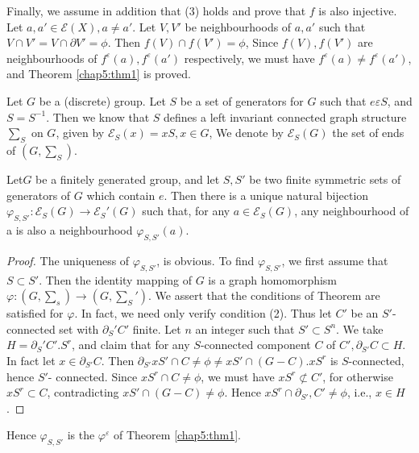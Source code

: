 Finally, we assume in addition that (3) holds and prove that $f$ is
also injective. Let $a, a' \in \mathscr{E} (X), a \neq a'$. Let $V,
V'$ be neighbourhoods of $a, a'$ such that $  V \cap V' = V \cap
\partial V' = \phi $. Then $f(V)\cap f(V')= \phi$, Since $f(V), f(V')$
are neighbourhoods of $f^{\varepsilon}(a), f^{\varepsilon}(a')$
respectively, we must have $f^\varepsilon (a) \neq f^\varepsilon
(a')$, and Theorem \ref{chap5:thm1} is proved.   

Let $G$ be a (discrete) group. Let $S$ be a set of generators for
$G$ such that $e \varepsilon S$, and $S = S^{-1}$. Then we know that
$S$ defines a left invariant connected graph structure $\sum_S$ on
$G$,  given by $\mathscr{E}_S (x) = x S, x \in G$, We denote by
$\mathscr{E}_S (G)$ the set of ends of $(G, \sum_S)$.  

\begin{thm} %
  Let\pageoriginale $G$ be a finitely generated group, and let $S, S'$ be two finite
  symmetric sets of generators of $G$ which contain $e$. Then there is a
  unique natural bijection $\varphi_{S, S'} : \mathscr{E}_S (G) \to
  \mathscr{E}_S'(G)$ such that, for any $a \in \mathscr{E}_S (G)$, any
  neighbourhood of a is also a neighbourhood $\varphi _{S, S'}(a)$. 
\end{thm}

\begin{proof}
  The uniqueness of $\varphi _{S, S'}$, is obvious. To find $\varphi
  _{S,S'}$, we first assume that $S \subset S'$. Then the identity
  mapping of $G$ is a graph homomorphism $\varphi : (G, \sum_s)\to
  (G, \sum_S')$. We assert that the conditions of Theorem are satisfied for
  $\varphi$. In fact, we need only verify condition (2). Thus let
  $C'$ be an $S'$-connected set with $\partial _S' C'$ finite. Let $n$
  an integer such that $S' \subset S^n$. We take $H = \partial _S'
  C'. S^r$, and claim that for any $S$-connected component $C$ of $C',
  \partial_{S'} C \subset H$. In fact let $x \in \partial_{S'}
  C$. Then $\partial_{S'}x 
  S' \cap C \neq \phi \neq x S' \cap (G - C). x S^r $ is $S$-connected,
  hence $S'$- connected. Since $xS^r \cap C \neq \phi$, we must have $x
  S^r \not\subset C'$, for otherwise  $xS^r \subset C$, contradicting
  $xS' \cap (G - C) \neq \phi $. Hence $x S^r \cap \partial_{S'}, C' \neq
  \phi$, i.e., $x \in H$.  
\end{proof}

Hence $\varphi_{S, S'}$ is the $\varphi^\varepsilon$ of Theorem \ref{chap5:thm1}. 

